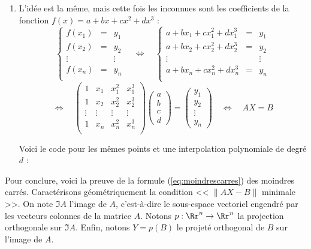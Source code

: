 \documentclass[class=report,crop=false]{standalone}
\begin{document}
\begin{enumerate}
  
  \item L'idée est la même, mais cette fois les inconnues 
  sont les coefficients de la fonction
  $f(x) = a + bx +c x^2 + dx^3$ :
   $$
  \left\{ 
  \begin{array}{ccl}
  f(x_1) &=& y_1 \\
  f(x_2) &=& y_2 \\
  \vdots && \vdots\\
  f(x_n) &=& y_n \\
  \end{array}
  \right.
  \quad
  \iff
  \quad
  \left\{ 
  \begin{array}{ccl}
  a +b x_1 + c x_1^2 + d x_1^3 &=& y_1 \\
  a +b x_2 + c x_2^2 + d x_2^3 &=& y_2 \\
  \vdots && \vdots\\
  a +b x_n + c x_n^2 + d x_n^3 &=& y_n \\
  \end{array}
  \right.
  $$
  $$
  \iff
  \quad 
  \begin{pmatrix}
  1 & x_1 & x_1^2 & x_1^3\\
  1 & x_2 & x_2^2 & x_2^3 \\
  \vdots & \vdots & \vdots & \vdots\\
  1 & x_n & x_n^2 & x_n^3  \\  
  \end{pmatrix}
  \begin{pmatrix}
  a \\ b \\ c \\ d
  \end{pmatrix}
  = 
  \begin{pmatrix}
  y_1\\
  y_2 \\
  \vdots \\
  y_n
  \end{pmatrix}
  \quad
  \iff
  \quad 
  AX = B
  $$ 
  
  Voici le code pour les mêmes points et une interpolation 
  polynomiale de degré $d$ :
    
  
\end{enumerate}

Pour conclure, voici la preuve de la formule 
(\ref{eq:moindrescarres}) des moindres carrés.
Caractérisons géométriquement la condition << $\| AX -B \|$ minimale >>.
On note $\Im A$ l'image de $A$, c'est-à-dire le sous-espace 
vectoriel engendré par les vecteurs colonnes de la matrice $A$.
Notons $p : \Rr^n \to \Rr^n$ la projection orthogonale sur $\Im A$.
Enfin, notons $Y=p(B)$ le projeté orthogonal de $B$ sur l'image de $A$. 
\end{document}
